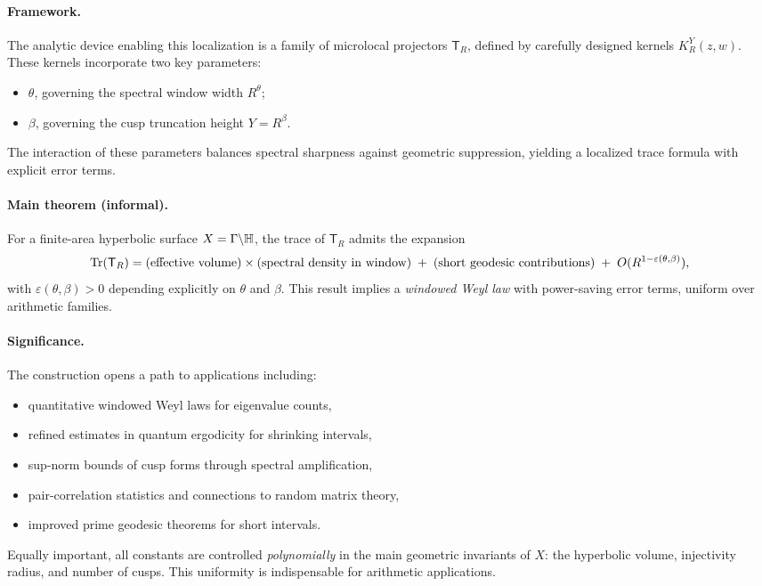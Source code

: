 \paragraph{Framework.}
The analytic device enabling this localization is a family of microlocal projectors
$\mathsf{T}_R$, defined by carefully designed kernels $K_R^Y(z,w)$.  
These kernels incorporate two key parameters:
\begin{itemize}
  \item $\theta$, governing the spectral window width $R^\theta$;
  \item $\beta$, governing the cusp truncation height $Y=R^\beta$.
\end{itemize}
The interaction of these parameters balances spectral sharpness against geometric
suppression, yielding a localized trace formula with explicit error terms.

\paragraph{Main theorem (informal).}
For a finite-area hyperbolic surface $X=\Gamma\backslash\mathbb{H}$, the trace of $\mathsf{T}_R$
admits the expansion
\[
  \mathrm{Tr}(\mathsf{T}_R) =
   \text{(effective volume)}\times\text{(spectral density in window)}
   \;+\; \text{(short geodesic contributions)}
   \;+\; O(R^{1-\varepsilon(\theta,\beta)}),
\]
with $\varepsilon(\theta,\beta)>0$ depending explicitly on $\theta$ and $\beta$.
This result implies a \emph{windowed Weyl law} with power-saving error terms, uniform over
arithmetic families.

\paragraph{Significance.}
The construction opens a path to applications including:
\begin{itemize}
  \item quantitative windowed Weyl laws for eigenvalue counts,
  \item refined estimates in quantum ergodicity for shrinking intervals,
  \item sup-norm bounds of cusp forms through spectral amplification,
  \item pair-correlation statistics and connections to random matrix theory,
  \item improved prime geodesic theorems for short intervals.
\end{itemize}
Equally important, all constants are controlled \emph{polynomially} in the main geometric
invariants of $X$: the hyperbolic volume, injectivity radius, and number of cusps.
This uniformity is indispensable for arithmetic applications.

